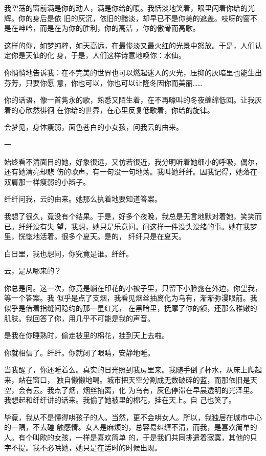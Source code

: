 \documentclass[12pt,a4paper]{article}
\newcommand{\subpart}[1]{
	\begingroup \par
	\vspace{1ex} \centering #1
	\par \endgroup
}
\begin{document}
		我空荡的窗前满是你的动人，满是你给的暖。我恬淡地笑着，眼里闪着你给的光辉。你的身后是依
	旧的灰沉，依旧的黯淡，却早已不是你美的遮盖。吱呀的窗不是在呻吟，而是在为你的胜利，你的高洁
	，你的傲骨而高歌。

		这样的你，如梦纯粹，如天高远，在最惨淡又最火红的光景中怒放。于是，人们认定你是天仙的化
	身，于是，人们这样诗意地唤你：水仙。

		你悄悄地告诉我：在不完美的世界也可以燃起迷人的火光，压抑的灰暗里也能生出芬芳，只要你愿
	意，你也可以，你也可以让隆冬因你而美丽……

		你的话语，像一首隽永的歌，熟悉又陌生着，在不再嚎叫的冬夜缠绵低回。让我灰着的心欣然徘徊
	在你给的世界，在心里反复低歌着，你给的旋律。

	\endwriting



		会梦见，身体瘦弱，面色苍白的小女孩，问我云的由来。

		\subpart{一}

		始终看不清面目的她，好象很远，又仿若很近，我分明听着她细小的呼吸，偶尔，还有她清亮却悲
	伤的歌声，有一句没一句地荡。我叫她纤纤。因我记得，她落在双肩那一样瘦弱的小辫子。

		纤纤问我，云的由来。她那么执着地要知道答案。

		我想了很久，竟没有个结果。于是，好多个夜晚，我总是无言地默对着她，笑笑而已。纤纤没有失
	望，我想，她只是乐意问。问这样一件没头没绪的事。她在我梦里，恍惚地活着。很多个夏天。是的，
	纤纤只是在夏天。

		白日里，我也想问，你究竟是谁。纤纤。

		云，是从哪来的？

		你总是问。这一次，你竟是躺在印花的小被子里，只留下小脸露在外边，你望我，等一个答案。我
	似乎是点了支烟，我看见烟丝抽离化为乌有，渐渐弥漫眼前。我似乎是借着指缝间隐约的那一星红光，
	在黑暗里，抚摩了你的额，还那么稚嫩的肌肤。我回答了你，用几乎不可能是我的声音。

		是我在你睡熟时，偷走被里的棉花，挂到天上去啦。

		你就相信了。纤纤。你就闭了眼睛，安静地睡。

		当我醒了，你还睡着么。真实的日光照到我房里来。我随手倒了杯水，从床上爬起来，站在窗口，
	独自懒懒地喝。城市把天空分割成无数破碎的蓝，而那依旧是天空，会有云。我点了烟，烟丝抽离，化
	为乌有，灰色停滞在早晨透明的光泽里。我想起和纤纤讲的话来。我偷了她被里的棉花，挂在天上。自
	己也笑了。

		毕竟，我从不是懂得哄孩子的人。当然，更不会哄女人。所以，我独居在城市中心的一隅，不去碰
	触感情。女人是麻烦的，总容易纠缠不清，而我，是喜欢简单的人。有个叫欧的女孩，一样是喜欢简单
	的，于是我们共同排遣着寂寞，其他的只字不提。我不必哄她，她只是在适时的时候出现。
\end{document}
